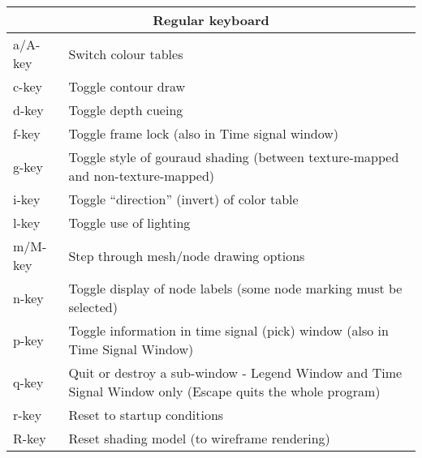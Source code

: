 \begin{table}[htbp]
\begin{center}
\begin{tabular}{|l|p{6in}|} \hline
        \multicolumn{2}{|c|}{\textbf{Regular keyboard}} \\ \hline
        a/A-key   &       Switch colour tables \\ \hline
        c-key   &       Toggle contour draw \\ \hline
        d-key   &       Toggle depth cueing\\ \hline
        f-key   &       Toggle frame lock (also in Time signal window)\\ \hline
       g-key   &       Toggle style of gouraud shading (between
       texture-mapped and non-texture-mapped) \\ \hline 
        i-key   &       Toggle ``direction'' (invert) of color table\\ \hline
        l-key   &       Toggle use of lighting\\ \hline
        m/M-key   &       Step through mesh/node drawing options \\ \hline
        n-key   &       Toggle display of node labels (some node marking
        must be selected)\\ \hline 
        p-key   &       Toggle information in time signal (pick) window
         (also in Time Signal Window)\\ \hline 
         q-key   &       Quit or destroy a sub-window - Legend Window and
         Time Signal Window only (Escape quits the 
                         whole program) \\ \hline
        r-key   &       Reset to startup conditions \\ \hline
        R-key   &       Reset shading model (to wireframe rendering) \\ \hline

\end{tabular}
\end{center}
\end{table}
